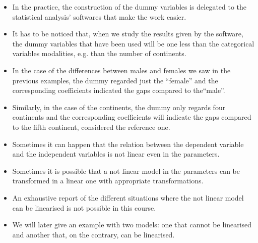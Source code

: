 \begin{frame}
  \begin{itemize}
    \item In the practice, the construction of the dummy variables is delegated to the statistical analysis' softwares that make the work easier.
    \item It has to be noticed that, when we study the results given by the software, the dummy variables that have been used will be one less than the categorical variables modalities, e.g. than the number of continents. 
    \item In the case of the differences between males and females we saw in the previous examples, the dummy regarded just the ``female'' and the corresponding coefficients indicated the gaps compared to the``male''.
    \item Similarly, in the case of the continents, the dummy only regards four continents and the corresponding coefficients will indicate the gaps compared to the fifth continent, considered the reference one.
  \end{itemize}
\end{frame}


\begin{frame}
  \vspace{0.25cm}
  \begin{itemize}
    \item Sometimes it can happen that the relation between the dependent variable and the independent variables is not linear even in the parameters.
    \vspace{0.25cm}
    \item Sometimes it is possible that a not linear model in the parameters can be transformed in a linear one with appropriate transformations.
    \vspace{0.25cm}
    \item An exhaustive report of the different situations where the not linear model can be linearised is not possible in this course.
    \vspace{0.25cm}
    \item We will later give an example with two models: one that cannot be linearised and another that, on the contrary, can be linearised. 
  \end{itemize}
\end{frame}

